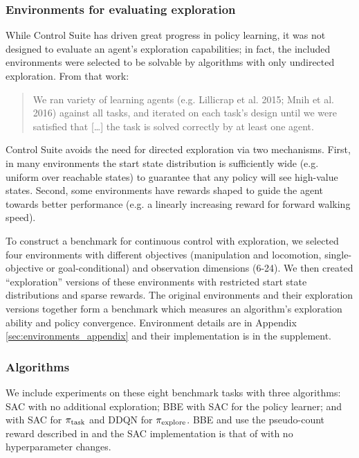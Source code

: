 \subsubsection{Environments for evaluating exploration}
While Control Suite has driven great progress in policy learning, it was not designed to evaluate an agent's exploration capabilities; in fact, the included environments were selected to be solvable by algorithms with only undirected exploration. From that work:
\begin{quote}
    We ran variety of learning agents (e.g. Lillicrap et al. 2015; Mnih et al. 2016) against all tasks, and iterated on each task’s design until we were satisﬁed that
    [\ldots]
    the task is solved correctly by at least one agent. \citep{tassa2018deepmind}
\end{quote}
Control Suite avoids the need for directed exploration via two mechanisms.
First, in many environments the start state distribution is sufficiently wide (e.g. uniform over reachable states) to guarantee that any policy will see high-value states.
Second, some environments have rewards shaped to guide the agent towards better performance (e.g. a linearly increasing reward for forward walking speed).

To construct a benchmark for continuous control with exploration, we selected four environments with different objectives (manipulation and locomotion, single-objective or goal-conditional) and observation dimensions (6-24).
We then created ``exploration'' versions of these environments with restricted start state distributions and sparse rewards.
The original environments and their exploration versions together form a benchmark which measures an algorithm's exploration ability and policy convergence.
Environment details are in Appendix \ref{sec:environments_appendix} and their implementation is in the supplement.

\subsubsection{Algorithms}
We include experiments on these eight benchmark tasks with three algorithms: SAC \citep{haarnoja2018softapp} with no additional exploration; BBE with SAC for the policy learner; and \algshort{} with SAC for $\pi_{\text{task}}$ and DDQN for $\pi_{\text{explore}}$.
BBE and \algshort{} use the pseudo-count reward described in  and the SAC implementation is that of \citet{pytorch_sac} with no hyperparameter changes.

